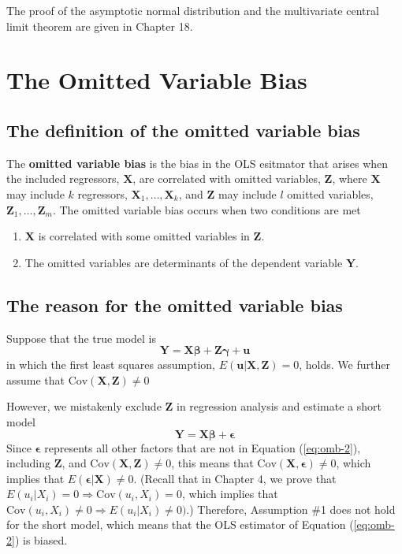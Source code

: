 \documentclass[a4paper,11pt]{article}
\newcommand{\cov}{\mathrm{Cov}}
\begin{document}
The proof of the asymptotic normal distribution and the multivariate
central limit theorem are given in Chapter 18.


\section{The Omitted Variable Bias}
\label{sec:org5d01267}

\subsection{The definition of the omitted variable bias}
\label{sec:orgb8158b6}
The \textbf{omitted variable bias} is the bias in the OLS esitmator that arises
when the included regressors, \(\mathbf{X}\), are correlated with
omitted variables, \(\mathbf{Z}\), where \(\mathbf{X}\) may include \(k\)
regressors, \(\mathbf{X}_1, \ldots, \mathbf{X}_k\), and \(\mathbf{Z}\)
may include \(l\) omitted variables, \(\mathbf{Z}_1, \ldots,
 \mathbf{Z}_m\). The omitted variable bias occurs
when two conditions are met
\begin{enumerate}
\item \(\mathbf{X}\) is correlated with some omitted variables in \(\mathbf{Z}\).
\item The omitted variables are determinants of the dependent variable
\(\mathbf{Y}\).
\end{enumerate}


\subsection{The reason for the omitted variable bias}
\label{sec:orgef9a574}
Suppose that the true model is
\begin{equation}
\label{eq:omb-1}
\mathbf{Y} = \mathbf{X}\boldsymbol{\beta} + \mathbf{Z}\boldsymbol{\gamma} + \mathbf{u}
\end{equation}
in which the first least squares assumption, \(E(\mathbf{u} |
\mathbf{X}, \mathbf{Z}) = 0\), holds. We further assume that \(\cov(\mathbf{X}, \mathbf{Z})
\neq 0\)

However, we mistakenly exclude \(\mathbf{Z}\) in regression analysis and
estimate a short model
\begin{equation}
\label{eq:omb-2}
\mathbf{Y} = \mathbf{X}\boldsymbol{\beta} + \boldsymbol{\epsilon}
\end{equation}
Since \(\boldsymbol{\epsilon}\) represents all other factors that are not
in Equation (\ref{eq:omb-2}), including \(\mathbf{Z}\), and
\(\cov(\mathbf{X}, \mathbf{Z}) \neq 0\), this means that
\(\cov(\mathbf{X}, \boldsymbol{\epsilon}) \neq 0\), which implies that
\(E(\boldsymbol{\epsilon} | \mathbf{X}) \neq 0\). (Recall that in
Chapter 4, we prove that \(E(u_i | X_i) = 0 \Rightarrow \cov(u_i, X_i)
= 0\), which implies that \(\cov(u_i, X_i) \neq 0 \Rightarrow E(u_i |
X_i) \neq 0)\).) Therefore, Assumption \#1 does not hold for the short
model, which means that the OLS estimator of Equation (\ref{eq:omb-2})
is biased.
\end{document}

